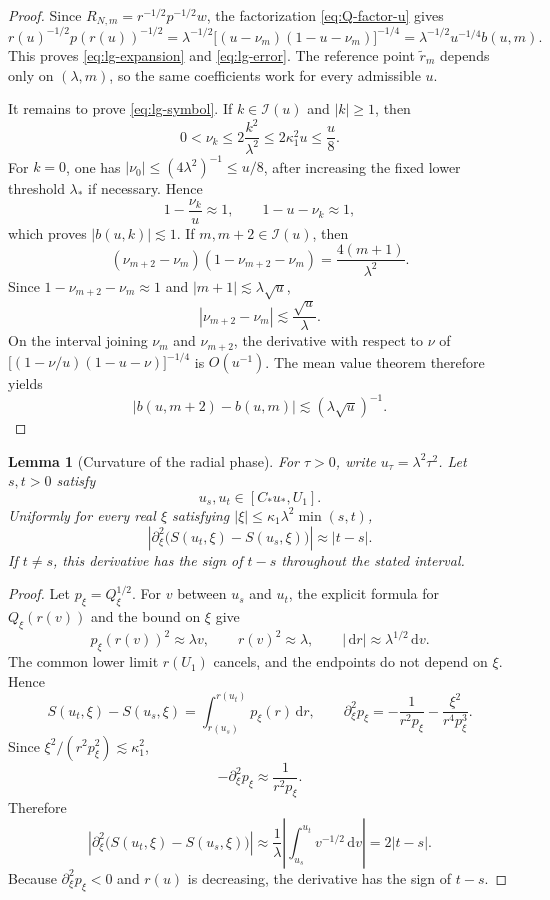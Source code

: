 \documentclass[11pt,a4paper]{amsart}
\newtheorem{lemma}[theorem]{Lemma}
\numberwithin{equation}{section}
\newcommand{\dd}{\,\mathrm d}
\begin{document}
\begin{proof}
Since \(R_{N,m}=r^{-1/2}p^{-1/2}w\), the factorization
\eqref{eq:Q-factor-u} gives
\[
 r(u)^{-1/2}p(r(u))^{-1/2}
 =\lambda^{-1/2}
  \bigl[(u-\nu_m)(1-u-\nu_m)\bigr]^{-1/4}
 =\lambda^{-1/2}u^{-1/4}b(u,m).
\]
This proves \eqref{eq:lg-expansion} and \eqref{eq:lg-error}. The reference
point \(\tilde r_m\) depends only on \((\lambda,m)\), so the same
coefficients work for every admissible \(u\).

It remains to prove \eqref{eq:lg-symbol}. If
\(k\in\mathcal I(u)\) and \(|k|\ge1\), then
\[
 0<\nu_k\le 2\frac{k^2}{\lambda^2}
 \le2\kappa_1^2u\le\frac u8.
\]
For \(k=0\), one has \(|\nu_0|\le(4\lambda^2)^{-1}\le u/8\), after
increasing the fixed lower threshold \(\lambda_*\) if necessary. Hence
\[
 1-\frac{\nu_k}{u}\approx1,
 \qquad
 1-u-\nu_k\approx1,
\]
which proves \(|b(u,k)|\lesssim1\). If
\(m,m+2\in\mathcal I(u)\), then
\[
 (\nu_{m+2}-\nu_m)(1-\nu_{m+2}-\nu_m)
 =\frac{4(m+1)}{\lambda^2}.
\]
Since \(1-\nu_{m+2}-\nu_m\approx1\) and
\(|m+1|\lesssim\lambda\sqrt u\),
\[
 |\nu_{m+2}-\nu_m|\lesssim\frac{\sqrt u}{\lambda}.
\]
On the interval joining \(\nu_m\) and \(\nu_{m+2}\), the derivative with
respect to \(\nu\) of
\(\bigl[(1-\nu/u)(1-u-\nu)\bigr]^{-1/4}\) is \(O(u^{-1})\).
The mean value theorem therefore yields
\[
 |b(u,m+2)-b(u,m)|\lesssim(\lambda\sqrt u)^{-1}.
\]
\end{proof}



\begin{lemma}[Curvature of the radial phase]\label{lem:phase-second-variation}
For \(\tau>0\), write \(u_\tau=\lambda^2\tau^2\). Let \(s,t>0\) satisfy
\[
 u_s,u_t\in[C_*u_*,U_1].
\]
Uniformly for every real \(\xi\) satisfying
\(|\xi|\le\kappa_1\lambda^2\min(s,t)\),
\[
 \left|\partial_\xi^2\bigl(S(u_t,\xi)-S(u_s,\xi)\bigr)\right|
 \approx|t-s|.
\]
If \(t\ne s\), this derivative has the sign of \(t-s\) throughout the
stated interval.
\end{lemma}

\begin{proof}
Let \(p_\xi=Q_\xi^{1/2}\). For \(v\) between \(u_s\) and \(u_t\),
the explicit formula for \(Q_\xi(r(v))\) and the bound on \(\xi\) give
\[
 p_\xi(r(v))^2\approx\lambda v,
 \qquad r(v)^2\approx\lambda,
 \qquad |\dd r|\approx\lambda^{1/2}\dd v.
\]
The common lower limit \(r(U_1)\) cancels, and the endpoints do not depend
on \(\xi\). Hence
\[
 S(u_t,\xi)-S(u_s,\xi)
 =\int_{r(u_s)}^{r(u_t)}p_\xi(r)\dd r,
 \qquad
 \partial_\xi^2p_\xi
 =-\frac1{r^2p_\xi}-\frac{\xi^2}{r^4p_\xi^3}.
\]
Since \(\xi^2/(r^2p_\xi^2)\lesssim\kappa_1^2\),
\[
 -\partial_\xi^2p_\xi\approx\frac1{r^2p_\xi}.
\]
Therefore
\[
 \left|\partial_\xi^2\bigl(S(u_t,\xi)-S(u_s,\xi)\bigr)\right|
 \approx\frac1\lambda
 \left|\int_{u_s}^{u_t}v^{-1/2}\dd v\right|
 =2|t-s|.
\]
Because \(\partial_\xi^2p_\xi<0\) and \(r(u)\) is decreasing, the derivative
has the sign of \(t-s\).
\end{proof}
\end{document}
